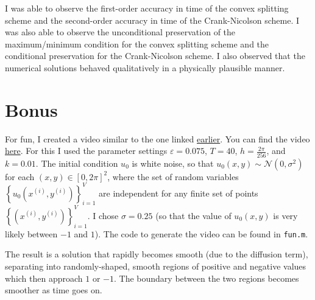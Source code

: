 \documentclass{article}
\begin{document}
	I was able to observe the first-order accuracy in time of the convex splitting scheme and the second-order accuracy in time of the Crank-Nicolson scheme. I was also able to observe the unconditional preservation of the maximum/minimum condition for the convex splitting scheme and the conditional preservation for the Crank-Nicolson scheme. I also observed that the numerical solutions behaved qualitatively in a physically plausible manner.
	
	\section{Bonus}
	
	For fun, I created a video similar to the one linked \href{https://www.youtube.com/watch?v=t1swj0QJUTw}{earlier}. You can find the video \href{https://drive.google.com/file/d/1sug_CRWRYPw71M63ox62002TP3sIG_EA/view?usp=sharing}{here}. For this I used the parameter settings $\varepsilon = 0.075$, $T=40$, $h = \frac{2\pi}{256}$, and $k = 0.01$. The initial condition $u_0$ is white noise, so that $u_0(x,y) \sim \mathcal{N}(0,\sigma^2)$ for each $(x,y) \in [0,2\pi]^2$, where the set of random variables $\left\{u_0\left(x^{(i)}, y^{(i)}\right)\right\}_{i=1}^V$ are independent for any finite set of points $\left\{\left(x^{(i)}, y^{(i)}\right)\right\}_{i=1}^V$. I chose $\sigma = 0.25$ (so that the value of $u_0(x,y)$ is very likely between $-1$ and $1$). The code to generate the video can be found in \verb*|fun.m|.
	
	The result is a solution that rapidly becomes smooth (due to the diffusion term), separating into randomly-shaped, smooth regions of positive and negative values which then approach $1$ or $-1$. The boundary between the two regions becomes smoother as time goes on.
	
	
	
\end{document}
